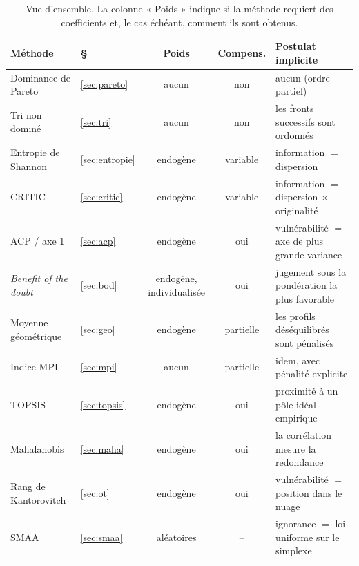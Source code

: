 \documentclass[11pt,a4paper]{article}
\theoremstyle{definition}
\theoremstyle{remark}
\begin{document}
\medskip

\begin{table}[htbp]
  \centering
  \small
  \renewcommand{\arraystretch}{1.25}
  \begin{tabularx}{\textwidth}{@{}l l c c X@{}}
  \toprule
  \textbf{Méthode} & \textbf{§} & \textbf{Poids} & \textbf{Compens.} & \textbf{Postulat implicite} \\
  \midrule
  Dominance de Pareto        & \ref{sec:pareto} & aucun      & non      & aucun (ordre partiel) \\
  Tri non dominé             & \ref{sec:tri}    & aucun      & non      & les fronts successifs sont ordonnés \\
  Entropie de Shannon        & \ref{sec:entropie} & endogène & variable & information $=$ dispersion \\
  CRITIC                     & \ref{sec:critic} & endogène   & variable & information $=$ dispersion $\times$ originalité \\
  ACP / axe 1                & \ref{sec:acp}    & endogène   & oui      & vulnérabilité $=$ axe de plus grande variance \\
  \emph{Benefit of the doubt}& \ref{sec:bod}    & endogène, individualisée & oui & jugement sous la pondération la plus favorable \\
  Moyenne géométrique        & \ref{sec:geo}    & endogène   & partielle& les profils déséquilibrés sont pénalisés \\
  Indice MPI                 & \ref{sec:mpi}    & aucun      & partielle& idem, avec pénalité explicite \\
  TOPSIS                     & \ref{sec:topsis} & endogène   & oui      & proximité à un pôle idéal empirique \\
  Mahalanobis                & \ref{sec:maha}   & endogène   & oui      & la corrélation mesure la redondance \\
  Rang de Kantorovitch       & \ref{sec:ot}     & endogène   & oui      & vulnérabilité $=$ position dans le nuage \\
  SMAA                       & \ref{sec:smaa}   & aléatoires & --       & ignorance $=$ loi uniforme sur le simplexe \\
  \bottomrule
  \end{tabularx}
  \caption{Vue d'ensemble. La colonne « Poids » indique si la méthode requiert des coefficients et,
  le cas échéant, comment ils sont obtenus.}
\end{table}

\end{document}
